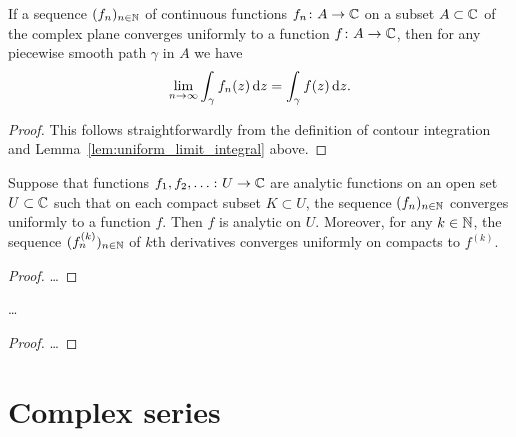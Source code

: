 \begin{corollary}
  \label{cor:uniform_limit_contour_integral}
  If a sequence $(f_n)_{n \in \mathbb{N}}$ of continuous functions
  $f_n \colon A \to \mathbb{C}$ on a subset $A \subset \mathbb{C}$  of the complex plane
  converges uniformly to a function
  $f \colon A \to \mathbb{C}$, then for any piecewise smooth path $\gamma$
  in $A$ we have
  \begin{align*}
    \lim_{n \to \infty} \int_\gamma f_n(z) \, \mathrm{d} z
      = \int_\gamma f(z) \, \mathrm{d} z .
  \end{align*}
\end{corollary}
\begin{proof}
  This follows straightforwardly from the definition of contour integration
  and Lemma~\ref{lem:uniform_limit_integral} above.
\end{proof}

\begin{lemma}
  \label{lem:uoc_convergent_analytic}
  \lean{}
  Suppose that functions $f_1, f_2, \ldots \colon U \to \mathbb{C}$
  are analytic functions on an open set $U \subset \mathbb{C}$
  such that on each compact subset $K \subset U$, the sequence
  $(f_n)_{n \in \mathbb{N}}$ converges uniformly to a
  function $f$. Then $f$ is analytic on $U$.
  Moreover, for any $k \in \mathbb{N}$, the sequence $(f^{(k)}_n)_{n \in \mathbb{N}}$
  of $k$th derivatives converges uniformly on compacts to $f^{(k)}$.
\end{lemma}
\begin{proof}
  \ldots
\end{proof}

\begin{lemma}
  \label{lem:cauchy_uniform_limit_criterion}
  \ldots
\end{lemma}
\begin{proof}
  \ldots
\end{proof}



\section{Complex series}

